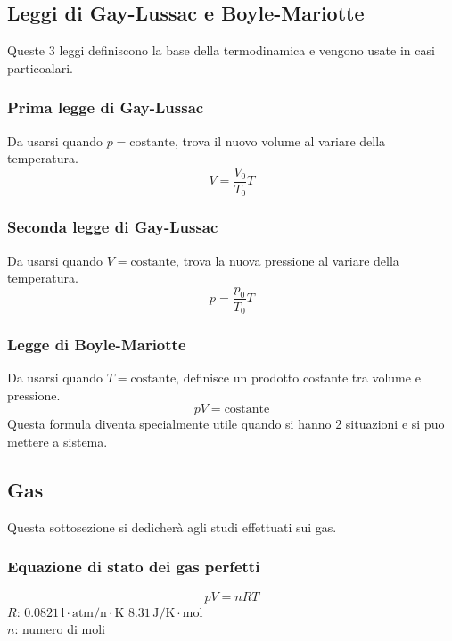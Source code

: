 \subsection{Leggi di Gay-Lussac e Boyle-Mariotte}
Queste 3 leggi definiscono la base della termodinamica e vengono usate in casi particoalari.

\subsubsection{Prima legge di Gay-Lussac}
Da usarsi quando $p = \text{costante}$, trova il nuovo volume al variare della temperatura.
\begin{equation*}
V = \frac{V_0}{T_0}T
\end{equation*}

\subsubsection{Seconda legge di Gay-Lussac}
Da usarsi quando $V = \text{costante}$, trova la nuova pressione al variare della temperatura.
\begin{equation*}
p = \frac{p_0}{T_0}T
\end{equation*}

\subsubsection{Legge di Boyle-Mariotte}
Da usarsi quando $T = \text{costante}$, definisce un prodotto costante tra volume e pressione.
\begin{equation*}
pV = \text{costante}
\end{equation*}
Questa formula diventa specialmente utile quando si hanno 2 situazioni e si puo mettere a sistema.

\subsection{Gas}
Questa sottosezione si dedicherà agli studi effettuati sui gas.

\subsubsection{Equazione di stato dei gas perfetti}
\begin{equation*}
pV = nRT
\end{equation*}
\hyperref[tab:R]{$R$}: $0.0821\,\text{l}\cdot\text{atm/n}\cdot\text{K}$
$8.31\,\text{J/K}\cdot\text{mol}$\\
$n$: numero di moli\\

